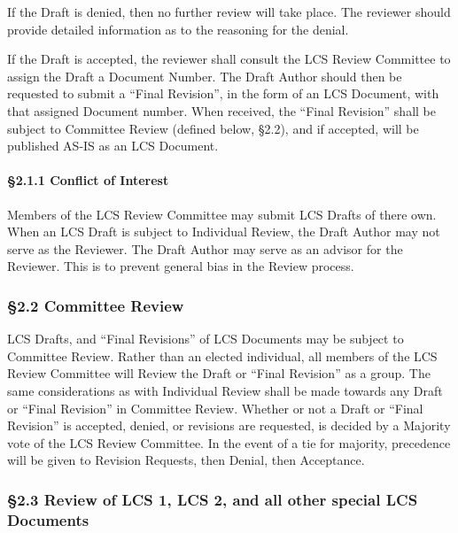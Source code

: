 If the Draft is denied, then no further review will take place. The
reviewer should provide detailed information as to the reasoning for the
denial.

If the Draft is accepted, the reviewer shall consult the LCS Review
Committee to assign the Draft a Document Number. The Draft Author should
then be requested to submit a ``Final Revision'', in the form of an LCS
Document, with that assigned Document number. When received, the ``Final
Revision'' shall be subject to Committee Review (defined below, §2.2),
and if accepted, will be published AS-IS as an LCS Document.

\hypertarget{conflict-of-interest}{%
\paragraph{§2.1.1 Conflict of Interest}\label{conflict-of-interest}}

Members of the LCS Review Committee may submit LCS Drafts of there own.
When an LCS Draft is subject to Individual Review, the Draft Author may
not serve as the Reviewer. The Draft Author may serve as an advisor for
the Reviewer. This is to prevent general bias in the Review process.

\hypertarget{committee-review}{%
\subsubsection{§2.2 Committee Review}\label{committee-review}}

LCS Drafts, and ``Final Revisions'' of LCS Documents may be subject to
Committee Review. Rather than an elected individual, all members of the
LCS Review Committee will Review the Draft or ``Final Revision'' as a
group. The same considerations as with Individual Review shall be made
towards any Draft or ``Final Revision'' in Committee Review. Whether or
not a Draft or ``Final Revision'' is accepted, denied, or revisions are
requested, is decided by a Majority vote of the LCS Review Committee. In
the event of a tie for majority, precedence will be given to Revision
Requests, then Denial, then Acceptance.

\hypertarget{review-of-lcs-1-lcs-2-and-all-other-special-lcs-documents}{%
\subsubsection{§2.3 Review of LCS 1, LCS 2, and all other special LCS
Documents}\label{review-of-lcs-1-lcs-2-and-all-other-special-lcs-documents}}

